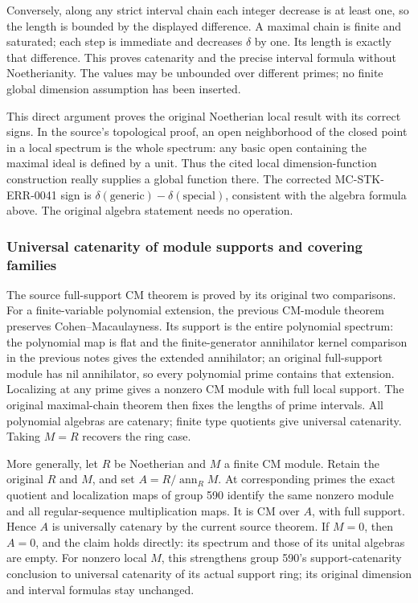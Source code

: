 Conversely, along any strict interval chain each integer decrease is at least one, so the length is bounded by the displayed difference. A maximal chain is finite and saturated; each step is immediate and decreases \(\delta\) by one. Its length is exactly that difference. This proves catenarity and the precise interval formula without Noetherianity. The values may be unbounded over different primes; no finite global dimension assumption has been inserted.

This direct argument proves the original Noetherian local result with its correct signs. In the source's topological proof, an open neighborhood of the closed point in a local spectrum is the whole spectrum: any basic open containing the maximal ideal is defined by a unit. Thus the cited local dimension-function construction really supplies a global function there. The corrected MC-\AlgebraIdentifierBreak{}STK-\AlgebraIdentifierBreak{}ERR-\AlgebraIdentifierBreak{}0041 sign is \(\delta(\text{generic})-\delta(\text{special})\), consistent with the algebra formula above. The original algebra statement needs no operation.

\subsubsection{Universal catenarity of module supports and covering families}\label{algebra-proof-020-universal-catenarity-of-module-supports-and-covering-families}

The source full-support CM theorem is proved by its original two comparisons. For a finite-variable polynomial extension, the previous CM-module theorem preserves Cohen--Macaulayness. Its support is the entire polynomial spectrum: the polynomial map is flat and the finite-generator annihilator kernel comparison in the previous notes gives the extended annihilator; an original full-support module has nil annihilator, so every polynomial prime contains that extension. Localizing at any prime gives a nonzero CM module with full local support. The original maximal-chain theorem then fixes the lengths of prime intervals. All polynomial algebras are catenary; finite type quotients give universal catenarity. Taking \(M=R\) recovers the ring case.

More generally, let \(R\) be Noetherian and \(M\) a finite CM module. Retain the original \(R\) and \(M\), and set \(A=R/\operatorname{ann}_R M\). At corresponding primes the exact quotient and localization maps of group 590 identify the same nonzero module and all regular-sequence multiplication maps. It is CM over \(A\), with full support. Hence \(A\) is universally catenary by the current source theorem. If \(M=0\), then \(A=0\), and the claim holds directly: its spectrum and those of its unital algebras are empty. For nonzero local \(M\), this strengthens group 590's support-catenarity conclusion to universal catenarity of its actual support ring; its original dimension and interval formulas stay unchanged.


